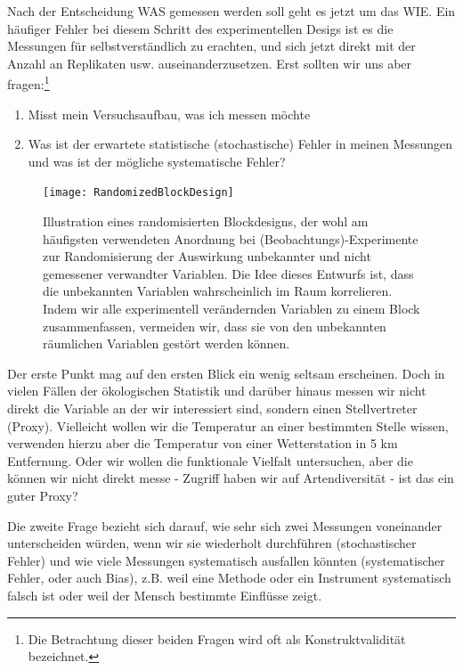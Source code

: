 \documentclass[a4paper,twoside]{tufte-book}\usepackage[]{graphicx}\usepackage[]{color}
\begin{document}
Nach der Entscheidung WAS gemessen werden soll geht es jetzt um das WIE. Ein häufiger Fehler bei diesem Schritt des experimentellen Desigs ist es die Messungen für selbstverständlich zu erachten, und sich jetzt direkt mit der Anzahl an Replikaten usw. auseinanderzusetzen. Erst sollten wir uns aber fragen:\footnote{Die Betrachtung dieser beiden Fragen wird oft als Konstruktvalidität bezeichnet.}

\begin{enumerate}  
  \item Misst mein Versuchsaufbau, was ich messen möchte
  \item Was ist der erwartete statistische (stochastische) Fehler in meinen Messungen und was ist der mögliche systematische Fehler?
\end{enumerate}

\begin{figure}[]
\begin{center}
\texttt{[image: RandomizedBlockDesign]}
\caption{Illustration eines randomisierten Blockdesigns, der wohl am häufigsten verwendeten Anordnung bei (Beobachtungs)-Experimente zur Randomisierung der Auswirkung unbekannter und nicht gemessener verwandter Variablen. Die Idee dieses Entwurfs ist, dass die unbekannten Variablen wahrscheinlich im Raum korrelieren. Indem wir alle experimentell verändernden Variablen zu einem Block zusammenfassen, vermeiden wir, dass sie von den unbekannten räumlichen Variablen gestört werden können.}
\label{fig: RandomizedBlockDesign}
\end{center}
\end{figure}


Der erste Punkt mag auf den ersten Blick ein wenig seltsam erscheinen. Doch in vielen Fällen der ökologischen Statistik und darüber hinaus messen wir nicht direkt die Variable an der wir interessiert sind, sondern einen Stellvertreter (Proxy). Vielleicht wollen wir die Temperatur an einer bestimmten Stelle wissen, verwenden hierzu aber die Temperatur von einer Wetterstation in 5 km Entfernung. Oder wir wollen die funktionale Vielfalt untersuchen, aber die können wir nicht direkt messe - Zugriff haben wir auf Artendiversität - ist das ein guter Proxy?

Die zweite Frage bezieht sich darauf, wie sehr sich zwei Messungen voneinander unterscheiden würden, wenn wir sie wiederholt durchführen (stochastischer Fehler) und wie viele Messungen systematisch ausfallen könnten (systematischer Fehler, oder auch Bias), z.B. weil eine Methode oder ein Instrument systematisch falsch ist oder weil der Mensch bestimmte Einflüsse zeigt.
\end{document}
